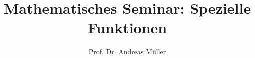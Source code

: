 %
%
%


\beamertemplatenavigationsymbolsempty
\title[SpezFunk]{Mathematisches Seminar: Spezielle Funktionen}
\author[A.~Müller]{Prof. Dr. Andreas Müller}
\date[]{}

